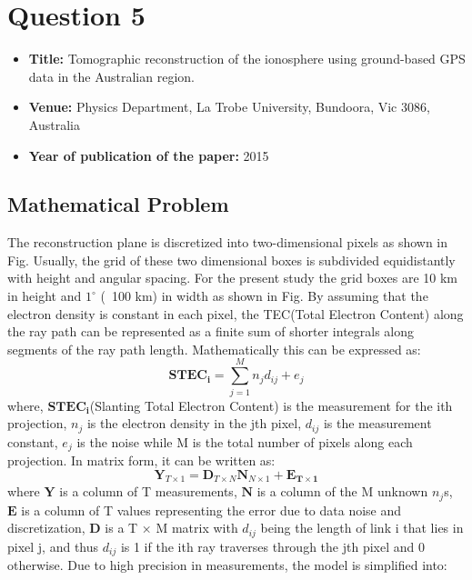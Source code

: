 \documentclass[12pt]{article}
\begin{document}
\section*{Question 5}
\begin{itemize}
    \item \textbf{Title:} Tomographic reconstruction of the ionosphere using ground-based GPS data in the Australian region.
    \item \textbf{Venue:}  Physics Department, La Trobe University, Bundoora, Vic 3086, Australia
    \item \textbf{Year of publication of the paper:} 2015
\end{itemize}
\subsection*{Mathematical Problem}
The reconstruction plane is discretized into two-dimensional pixels as shown in Fig. Usually, the grid of these two dimensional boxes is subdivided equidistantly with height and angular spacing. For the present study the grid boxes are 10 km in height and $1^\circ$ (~100 km) in width as shown in Fig. By assuming that the electron density is constant in each pixel, the TEC(Total Electron Content) along the ray path can be represented as a finite sum of shorter integrals along segments of the ray path length. Mathematically this can be expressed as:
\begin{equation*}
    \boldsymbol{STEC_i} = \sum_{j=1}^{M}n_jd_{ij}+e_j
\end{equation*}
where, $\boldsymbol{STEC_i}$(Slanting Total Electron Content) is the measurement for the ith projection, $n_j$ is the electron density in the jth pixel, $d_{ij}$ is the measurement constant, $e_j$ is the noise while M is the total number of pixels along each projection. In matrix form, it can be written as:
\begin{equation*}
    \boldsymbol{Y}_{T\times1} = \boldsymbol{D}_{T\times N}\boldsymbol{N}_{N\times1} + \boldsymbol{E_{T\times1}}
\end{equation*}
where $\boldsymbol{Y}$ is a column of T measurements, $\boldsymbol{N}$ is a column of the M unknown $n_j$s, $\boldsymbol{E}$ is a column of T values representing the error due to data noise and discretization, $\boldsymbol{D}$ is a T × M matrix with $d_{ij}$ being the length of link i that lies in pixel j, and thus $d_{ij}$ is 1 if the ith ray traverses through the jth pixel and 0 otherwise. Due to high precision in measurements, the model is simplified into:
\end{document}
